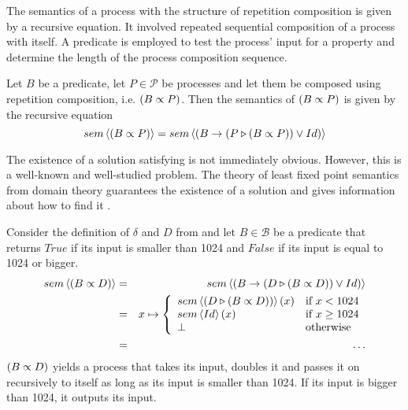 The semantics of a process with the structure of repetition composition is given by a recursive equation. It involved repeated sequential composition of a process with itself. A predicate is employed to test the process' input for a property and determine the length of the process composition sequence.
\begin{definition}
\label{def:sem_repetition}
Let $B$ be a predicate, let $P \in \mathcal{P}$ be processes and let them be composed using repetition composition, i.e. $\left( B \propto P \right)$. Then the semantics of $\left( B \propto P \right)$ is given by the recursive equation
  \begin{equation*}
    \label{eqn_sem_repetition}
    sem \left\langle \left( B \propto P \right) \right\rangle = sem \left\langle \left( B \to \left( P \triangleright \left( B \propto P \right) \right) \vee Id \right) \right\rangle
  \end{equation*}
  \hfill\qedsymbol
\end{definition}

The existence of a solution satisfying  is not immediately obvious. However, this is a well-known and well-studied problem. The theory of least fixed point semantics from domain theory guarantees the existence of a solution and gives information about how to find it \cite{DenSem}.

\begin{example}
\label{exp:sem_repetition}
Consider the definition of $\delta$ and $D$ from  and let $B \in \mathcal{B}$ be a predicate that returns $True$ if its input is smaller than 1024 and $False$ if its input is equal to 1024 or bigger.
  \begin{eqnarray*}
    sem \left\langle \left( B \propto D \right) \right\rangle & = & sem \left\langle \left( B \to \left( D \triangleright \left( B \propto D \right) \right) \vee Id \right) \right\rangle \\
                            & = & x \mapsto \left\{ \begin{array}{ll} 
                                                      sem \left\langle \left( D \triangleright \left( B \propto D \right) \right) \right\rangle \left( x \right) & \text{if } x < 1024 \\
                                                      sem \left\langle Id \right\rangle \left( x \right)                              & \text{if } x \geq 1024 \\
                                                      \bot                                                   & \text{otherwise}
                                                    \end{array}
                                            \right. \\
                            & = & \ldots
  \end{eqnarray*}
$\left( B \propto D \right)$ yields a process that takes its input, doubles it and passes it on recursively to itself as long as its input is smaller than 1024. If its input is bigger than 1024, it outputs its input.
\end{example}


